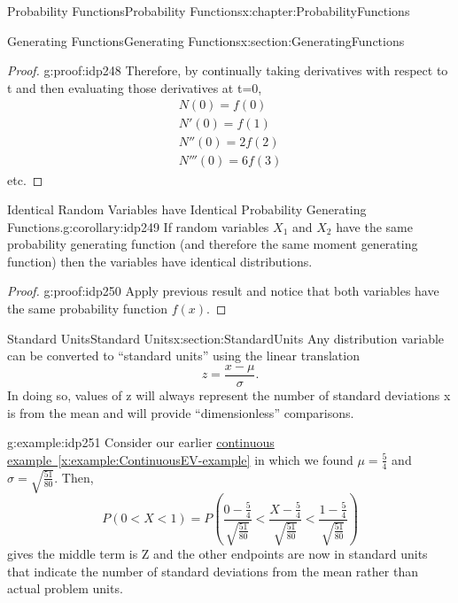 \documentclass[oneside,10pt,]{book}
\newcommand{\xreffont}{\relax}
\numberwithin{equation}{section}
\begin{document}
\begin{chapterptx}{Probability Functions}{}{Probability Functions}{}{}{x:chapter:ProbabilityFunctions}
\begin{sectionptx}{Generating Functions}{}{Generating Functions}{}{}{x:section:GeneratingFunctions}
\begin{proof}{}{g:proof:idp248}
Therefore, by continually taking derivatives with respect to t and then evaluating those derivatives at t=0,%
\begin{gather*}
N(0) = f(0)\\
N'(0) = f(1)\\
N''(0) = 2 f(2)\\
N'''(0) = 6 f(3) 
\end{gather*}
etc.%
\end{proof}
\begin{corollary}{Identical Random Variables have Identical Probability Generating Functions.}{}{g:corollary:idp249}%
If random variables \(X_1\) and \(X_2\) have the same probability generating function (and therefore the same moment generating function) then the variables have identical distributions.\end{corollary}
\begin{proof}{}{g:proof:idp250}
Apply previous result and notice that both variables have the same probability function \(f(x)\).%
\end{proof}
\end{sectionptx}
%
%
\typeout{************************************************}
\typeout{************************************************}
%
\begin{sectionptx}{Standard Units}{}{Standard Units}{}{}{x:section:StandardUnits}
Any distribution variable can be converted to “standard units” using the linear translation%
\begin{equation*}
\displaystyle z = \frac{x-\mu}{\sigma}.
\end{equation*}
In doing so, values of z will always represent the number of standard deviations x is from the mean and will provide “dimensionless” comparisons.%
\par
\begin{example}{}{g:example:idp251}%
Consider our earlier \hyperref[x:example:ContinuousEV-example]{continuous example~{\xreffont\ref{x:example:ContinuousEV-example}}} in which we found \(\mu = \frac{5}{4}\) and \(\sigma = \sqrt{\frac{51}{80}}\).  Then,%
\begin{equation*}
P(0 < X < 1) = P \left ( \frac{0-\frac{5}{4}}{\sqrt{\frac{51}{80}}} < \frac{X - \frac{5}{4}}{\sqrt{\frac{51}{80}}} < \frac{1-\frac{5}{4}}{\sqrt{\frac{51}{80}}} \right )
\end{equation*}
gives the middle term is Z and the other endpoints are now in standard units that indicate the number of standard deviations from the mean rather than actual problem units.%

\end{example}
\end{sectionptx}
\end{chapterptx}
\end{document}
